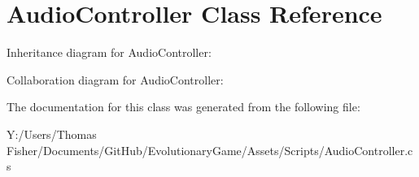 \hypertarget{class_audio_controller}{}\section{Audio\+Controller Class Reference}
\label{class_audio_controller}


Inheritance diagram for Audio\+Controller\+:


Collaboration diagram for Audio\+Controller\+:


The documentation for this class was generated from the following file\+:\begin{DoxyCompactItemize}
\item 
Y\+:/\+Users/\+Thomas Fisher/\+Documents/\+Git\+Hub/\+Evolutionary\+Game/\+Assets/\+Scripts/Audio\+Controller.\+cs\end{DoxyCompactItemize}
